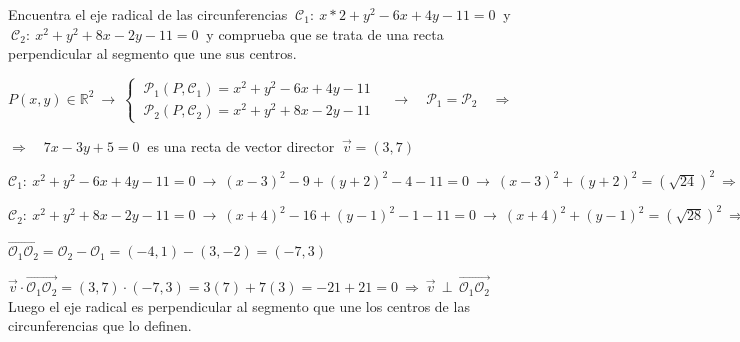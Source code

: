 \begin{miejercicio}

Encuentra el eje radical de las circunferencias $\ \mathcal C_1:\ x*2+y^2-6x+4y-11=0\ $ y $\ \mathcal C_2:\ x^2+y^2+8x-2y-11=0\ $ y comprueba que se trata de una recta perpendicular al segmento que une sus centros.

\vspace{6mm} $P(x,y)\in \mathbb R^2 \ \to \ \begin{cases} \ \mathcal P_1(P,\mathcal C_1)=x^2+y^2-6x+4y-11 \\ \ \mathcal P_2(P,\mathcal C_2)=x^2+y^2+8x-2y-11 \end{cases} \quad \to \quad  \mathcal P_1=\mathcal P_2 \quad \Rightarrow$

\vspace{3mm}$\Rightarrow \quad 7x-3y+5=0 \ $ es una recta de vector director $\ \vec v=(3,7)$ \QED

\vspace{2mm} $\mathcal C_1:\ x^2+y^2-6x+4y-11=0 \ \to \ (x-3)^2-9+(y+2)^2-4-11=0 \ \to \ (x-3)^2+(y+2)^2=(\sqrt{24})^2 \ \Rightarrow \ \mathcal C_2 \, \Big( \, \mathcal O_1(3,-2)\, , \, \mathcal R_1=\sqrt{24}\, \Big)$

\vspace{2mm} $\mathcal C_2:\ x^2+y^2+8x-2y-11=0 \ \to \ (x+4)^2-16+(y-1)^2-1-11=0 \ \to \ (x+4)^2+(y-1)^2=(\sqrt{28})^2 \ \Rightarrow \ \mathcal C_2 \, \Big( \, \mathcal O_1(-4,1)\, , \, \mathcal R_1=\sqrt{28}\, \Big)$

\vspace{2mm} $\overrightarrow {\mathcal O_1 \mathcal O_2}=\mathcal O_2-\mathcal O_1=(-4,1)-(3,-2)=(-7,3)$

\vspace{2mm} $\vec v \cdot \overrightarrow {\mathcal O_1 \mathcal O_2} = (3,7)\cdot (-7,3)=3(7)+7(3)=-21+21=0 \ \Rightarrow \ \vec v \, \perp \,  \overrightarrow {\mathcal O_1 \mathcal O_2} \ \ $ Luego el eje radical es perpendicular al segmento que une los centros de las circunferencias que lo definen. \QED
	
\end{miejercicio}

\vspace{5mm}

